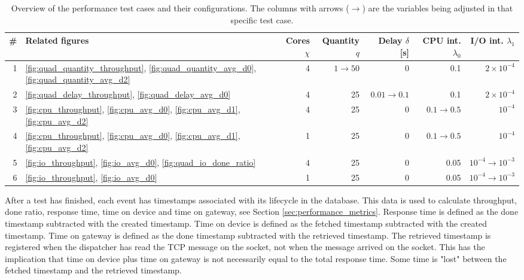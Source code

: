 \bgroup
\def\arraystretch{1.2}
\begin{table}[h!]

    \caption[Overview of the performance test cases.]{Overview of the
    performance test cases and their configurations.  The columns with arrows
    ($\rightarrow$) are the variables being adjusted in that specific test
    case.}

    \label{tab:test_overview}
\begin{center}
\begin{tabular}{|r|l|r|r|r|r|r|}
    \hline
    \# & Related figures & Cores $\chi$ & Quantity $q$ & Delay $\delta$ [s] & CPU int. $\lambda_0$ & I/O int. $\lambda_1$ \\
    \hline
    1 & \ref{fig:quad_quantity_throughput}, \ref{fig:quad_quantity_avg_d0},
    \ref{fig:quad_quantity_avg_d2} & 4 & $1 \rightarrow 50$ & 0 & 0.1 & $2
    \times 10^{-4}$ \\
    \hline
    2 & \ref{fig:quad_delay_throughput}, \ref{fig:quad_delay_avg_d0} & 4 & 25 &
    $0.01 \rightarrow 0.1$ & 0.1 & $2 \times 10^{-4}$ \\
    \hline
    3 & \ref{fig:cpu_throughput}, \ref{fig:cpu_avg_d0}, \ref{fig:cpu_avg_d1},
    \ref{fig:cpu_avg_d2} & 4 & 25 & 0 & $0.1 \rightarrow 0.5$ & $10^{-4}$ \\
    \hline
    4 & \ref{fig:cpu_throughput}, \ref{fig:cpu_avg_d0}, \ref{fig:cpu_avg_d1},
    \ref{fig:cpu_avg_d2} & 1 & 25 & 0 & $0.1 \rightarrow 0.5$ & $10^{-4}$ \\
    \hline
    5 & \ref{fig:io_throughput}, \ref{fig:io_avg_d0},
    \ref{fig:quad_io_done_ratio} & 4 & 25 & 0 & 0.05 & $10^{-4} \rightarrow 10^{-3}$ \\
    \hline
    6 & \ref{fig:io_throughput}, \ref{fig:io_avg_d0} & 1 & 25 & 0 & 0.05 & $10^{-4} \rightarrow 10^{-3}$ \\
    \hline
\end{tabular}
\end{center}
\end{table}

After a test has finished, each event has timestamps associated with its
lifecycle in the database. This data is used to calculate throughput, done
ratio, response time, time on device and time on gateway, see Section
\ref{sec:performance_metrics}. Response time is defined as the done timestamp
subtracted with the created timestamp. Time on device is defined as the fetched
timestamp subtracted with the created timestamp. Time on gateway is defined as
the done timestamp subtracted with the retrieved timestamp. The retrieved
timestamp is registered when the dispatcher has read the TCP message on the
socket, not when the message arrived on the socket. This has the implication
that time on device plus time on gateway is not necessarily equal to the total
response time. Some time is "lost" between the fetched timestamp and the
retrieved timestamp.

